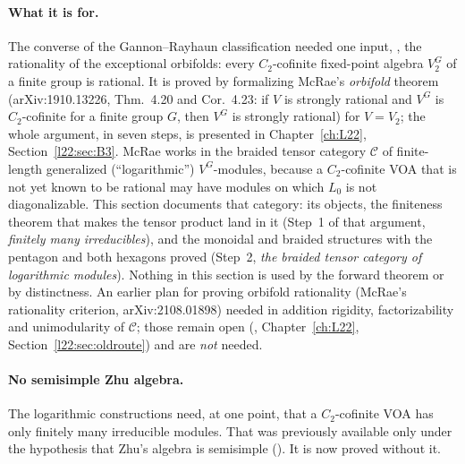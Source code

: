 \paragraph{What it is for.} The converse of the Gannon--Rayhaun classification needed one input,
, the rationality of the exceptional orbifolds: every $C_2$-cofinite fixed-point algebra $V_2^G$ of a finite group is
rational. It is proved by formalizing McRae's \emph{orbifold} theorem (arXiv:1910.13226, Thm.~4.20 and Cor.~4.23: if
$V$ is strongly rational and $V^G$ is $C_2$-cofinite for a finite group $G$, then $V^G$ is strongly rational) for
$V=V_2$; the whole argument, in seven steps, is presented in Chapter~\ref{ch:L22}, Section~\ref{l22:sec:B3}. McRae works in
the braided tensor category $\mathcal C$ of finite-length generalized (``logarithmic'') $V^G$-modules, because a
$C_2$-cofinite VOA that is not yet known to be rational may have modules on which $L_0$ is not diagonalizable. This
section documents that category: its objects, the finiteness theorem that makes the tensor product land in it (Step~1 of that argument,
\emph{finitely many irreducibles}), and the monoidal and braided structures with the pentagon and both hexagons proved
(Step~2, \emph{the braided tensor category of logarithmic modules}). Nothing in this section is
used by the forward theorem or by distinctness. An earlier plan for proving orbifold rationality (McRae's rationality criterion,
arXiv:2108.01898) needed in addition rigidity, factorizability and unimodularity of $\mathcal C$; those remain open
(, Chapter~\ref{ch:L22}, Section~\ref{l22:sec:oldroute}) and are \emph{not} needed.

\paragraph{No semisimple Zhu algebra.} The logarithmic constructions need, at one point, that a $C_2$-cofinite VOA has
only finitely many irreducible modules. That was previously available only under the hypothesis that Zhu's algebra is
semisimple (). It is now proved without it.

